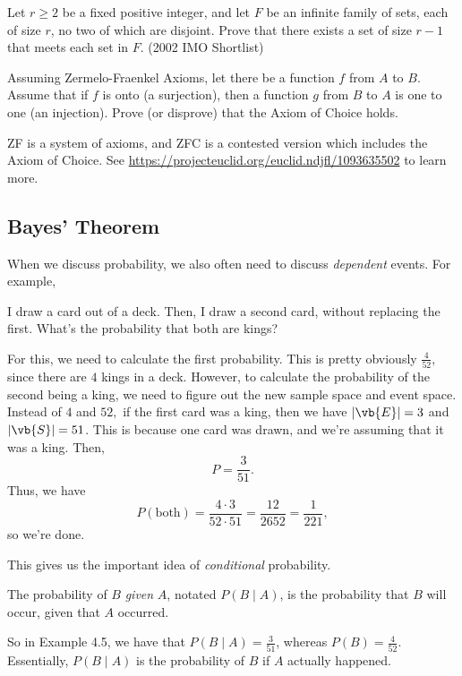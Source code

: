 \documentclass[11pt]{article}
\begin{document}
\begin{problem}[HM45]
    Let $r \ge 2$ be a fixed positive integer, and let $\displaystyle F$ be an infinite family of sets, each of size $\displaystyle r$, no two of which are disjoint. Prove that there exists a set of size $\displaystyle r-1$ that meets each set in $\displaystyle F$. (2002 IMO Shortlist)
\end{problem}
\begin{problem}[HM50]
    Assuming Zermelo-Fraenkel Axioms, let there be a function $f$ from $A$ to $B$. Assume that if $f$ is onto (a surjection), then a function $g$ from $B$ to $A$ is one to one (an injection). Prove (or disprove) that the Axiom of Choice holds.
    \begin{remark}
        ZF is a system of axioms, and ZFC is a contested version which includes the Axiom of Choice. See \url{https://projecteuclid.org/euclid.ndjfl/1093635502} to learn more.
    \end{remark}
\end{problem}

\subsection{Bayes' Theorem}
When we discuss probability, we also often need to discuss \textit{dependent} events. For example,
\begin{example}
    I draw a card out of a deck. Then, I draw a second card, without replacing the first. What's the probability that both are kings?
\end{example}
\begin{solution}
    For this, we need to calculate the first probability. This is pretty obviously $\frac{4}{52},$ since there are $4$ kings in a deck. However, to calculate the probability of the second being a king, we need to figure out the new sample space and event space. Instead of $4$ and $52,$ if the first card was a king, then we have $|\vb{E}| = 3$ and $|\vb{S}| = 51$. This is because one card was drawn, and we're assuming that it was a king. Then,
    \[P = \frac{3}{51}.\]
    Thus, we have
    \[P(\text{both}) = \frac{4 \cdot 3}{52 \cdot 51} = \frac{12}{2652} = \boxed{\frac{1}{221}},\]
    so we're done.
\end{solution}

\noindent This gives us the important idea of \textit{conditional} probability.

\begin{defn}
    The probability of $B$ \textit{given} $A$, notated $P(B\mid A)$, is the probability that $B$ will occur, given that $A$ occurred.
\end{defn}
So in Example 4.5, we have that $P(B \mid A) = \frac{3}{51}$, whereas $P(B) = \frac{4}{52}$. Essentially, $P(B \mid A)$ is the probability of $B$ if $A$ actually happened.
\end{document}
